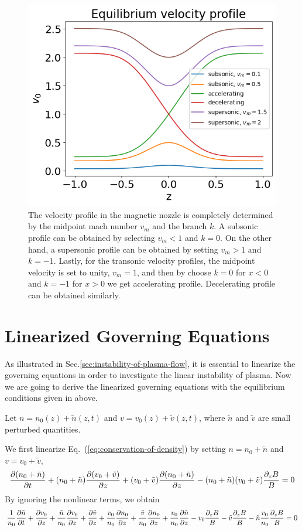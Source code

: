 \begin{figure}[htbp]
	\centering
	\includegraphics[width=0.7\linewidth]{figures/velocity-profiles}
	\caption{The velocity profile in the magnetic nozzle is completely determined by the midpoint mach number $v_m$ and the branch $k$. A subsonic profile can be obtained by selecting $v_m<1$ and $k=0$. On the other hand, a supersonic profile can be obtained by setting $v_m>1$ and $k=-1$. Lastly, for the transonic velocity profiles, the midpoint velocity is set to unity, $v_m=1$, and then by choose $k=0$ for $x<0$ and $k=-1$ for $x>0$ we get accelerating profile. Decelerating profile can be obtained similarly.}
	\label{fig:velocity-profiles}
\end{figure}

\section{Linearized Governing Equations}
As illustrated in Sec.\ref{sec:instability-of-plasma-flow}, it is essential to linearize the governing equations in order to investigate the linear instability of plasma. Now we are going to derive the linearized governing equations with the equilibrium conditions given in above.

Let $n = n_0(z) + \tilde{n}(z,t)$ and $v = v_0(z) + \tilde{v}(z,t)$, where $\tilde{n}$ and $\tilde{v}$ are small perturbed quantities.

We first linearize Eq.~(\ref{eq:conservation-of-density}) by setting $n=n_0+\tilde{n}$ and $v=v_0+\tilde{v}$,
\[    \pdv{(n_0+\tilde{n})}{t}
	+ (n_0+\tilde{n})\pdv{(v_0+\tilde{v})}{z}
	+ (v_0+\tilde{v})\pdv{(n_0+\tilde{n})}{z}
	- (n_0+\tilde{n})(v_0+\tilde{v})\frac{\partial_z B}{B} = 0
\]
By ignoring the nonlinear terms, we obtain
\[ \frac{1}{n_0}\pdv{\tilde{n}}{t}
	+ \pdv{v_0}{z} + \frac{\tilde{n}}{n_0}\pdv{v_0}{z} + \pdv{\tilde{v}}{z}
	+ \frac{v_0}{n_0}\pdv{n_0}{z} + \frac{\tilde{v}}{n_0}\pdv{n_0}{z} + \frac{v_0}{n_0}\pdv{\tilde{n}}{z}
	- v_0\frac{\partial_z B}{B} - \tilde{v}\frac{\partial_z B}{B} - \tilde{n}\frac{v_0}{n_0}\frac{\partial_z B}{B} = 0
\]


